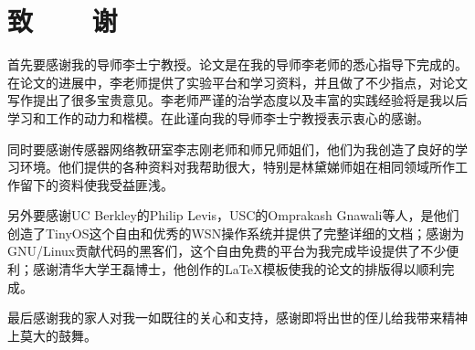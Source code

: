﻿%
%
%


%
%
\renewcommand{\baselinestretch}{1.5}
\fontsize{12pt}{13pt}\selectfont

\chapter*{致~~~~谢}
首先要感谢我的导师李士宁教授。论文是在我的导师李老师的悉心指导下完成的。在论文的进展中，李老师提供了实验平台和学习资料，并且做了不少指点，对论文写作提出了很多宝贵意见。李老师严谨的治学态度以及丰富的实践经验将是我以后学习和工作的动力和楷模。在此谨向我的导师李士宁教授表示衷心的感谢。

同时要感谢传感器网络教研室李志刚老师和师兄师姐们，他们为我创造了良好的学习环境。他们提供的各种资料对我帮助很大，特别是林黛娣师姐在相同领域所作工作留下的资料使我受益匪浅。

另外要感谢UC Berkley的Philip Levis，USC的Omprakash Gnawali等人，是他们创造了TinyOS这个自由和优秀的WSN操作系统并提供了完整详细的文档；感谢为GNU/Linux贡献代码的黑客们，这个自由免费的平台为我完成毕设提供了不少便利；感谢清华大学王磊博士，他创作的\LaTeX 模板使我的论文的排版得以顺利完成。

最后感谢我的家人对我一如既往的关心和支持，感谢即将出世的侄儿给我带来精神上莫大的鼓舞。
